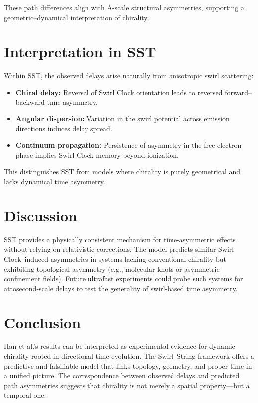 \documentclass[smallextended]{svjour3}       %
\begin{document}
These path differences align with \AA-scale structural asymmetries, supporting a geometric--dynamical interpretation of chirality.


\section{Interpretation in SST}
Within SST, the observed delays arise naturally from anisotropic swirl scattering:
\begin{itemize}
    \item \textbf{Chiral delay:} Reversal of Swirl Clock orientation leads to reversed forward--backward time asymmetry.
    \item \textbf{Angular dispersion:} Variation in the swirl potential across emission directions induces delay spread.
    \item \textbf{Continuum propagation:} Persistence of asymmetry in the free-electron phase implies Swirl Clock memory beyond ionization.
\end{itemize}
This distinguishes SST from models where chirality is purely geometrical and lacks dynamical time asymmetry.


\section{Discussion}
SST provides a physically consistent mechanism for time-asymmetric effects without relying on relativistic corrections. The model predicts similar Swirl Clock--induced asymmetries in systems lacking conventional chirality but exhibiting topological asymmetry (e.g., molecular knots or asymmetric confinement fields). Future ultrafast experiments could probe such systems for attosecond-scale delays to test the generality of swirl-based time asymmetry.


\section{Conclusion}
Han et al.'s results can be interpreted as experimental evidence for dynamic chirality rooted in directional time evolution. The Swirl--String framework offers a predictive and falsifiable model that links topology, geometry, and proper time in a unified picture. The correspondence between observed delays and predicted path asymmetries suggests that chirality is not merely a spatial property---but a temporal one.


\printbibliography
\end{document}
